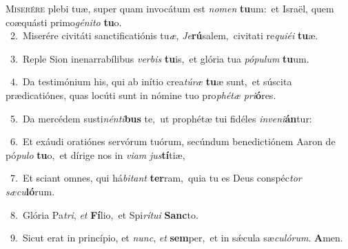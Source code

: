 \lettrine{\initial\textcolor{\initialcolor}{M}}{iserére} plebi tuæ, super quam invocátum est \textit{no}\-\textit{men} \textbf{tu}\-um:~\star et Israël, quem coæquásti primo\-\textit{gé}\-\textit{ni}\textit{to} \textbf{tu}\-o.\\
{\numbfont\textcolor{\numbcolor}{~2.}}~Miserére civitáti sanctificatiónis tu\-\textit{æ}\-, \textit{Je}\-\textbf{rú}salem,~\star civitati re\-\textit{qui}\-\textit{é}\textit{i} \textbf{tu}\-æ.\par
{\numbfont\textcolor{\numbcolor}{~3.}}~Reple Sion inenarrabílibus \textit{ver}\-\textit{bis} \textbf{tu}\-is,~\star et glória tua \textit{pó}\-\textit{pu}\textit{lum} \textbf{tu}\-um.\par
{\numbfont\textcolor{\numbcolor}{~4.}}~Da testimónium his, qui ab inítio crea\-\textit{tú}\-\textit{ræ} \textbf{tu}\-æ sunt,~\star et súscita prædicatiónes, quas locúti sunt in nómine tuo pro\-\textit{phé}\-\textit{tæ} \textit{pri}\-\textbf{ó}res.\par
{\numbfont\textcolor{\numbcolor}{~5.}}~Da mercédem susti\-\textit{nén}\-\textit{ti}\textbf{bus} te,~\star ut prophétæ tui fidéles \textit{in}\-\textit{ve}\textit{ni}\textbf{án}tur:\par
{\numbfont\textcolor{\numbcolor}{~6.}}~Et exáudi oratiónes servórum tuórum, secúndum benedictiónem Aaron de pó\-\textit{pu}\-\textit{lo} \textbf{tu}\-o,~\star et dírige nos in \textit{vi}\-\textit{am} \textit{jus}\-\textbf{tí}tiæ,\par
{\numbfont\textcolor{\numbcolor}{~7.}}~Et sciant omnes, qui há\-\textit{bi}\-\textit{tant} \textbf{ter}\-ram,~\star quia tu es Deus conspéc\textit{tor} \textit{sæ}\-\textit{cu}\textbf{ló}rum.\par
{\numbfont\textcolor{\numbcolor}{~8.}}~Glória Pa\-\textit{tri}\-, \textit{et} \textbf{Fí}\-lio,~\star et Spi\-\textit{rí}\-\textit{tu}\textit{i} \textbf{Sanc}\-to.\par
{\numbfont\textcolor{\numbcolor}{~9.}}~Sicut erat in princípio, et \textit{nunc}\-, \textit{et} \textbf{sem}\-per,~\star et in sǽcula sæ\-\textit{cu}\-\textit{ló}\textit{rum}. \textbf{A}\-men.\par
